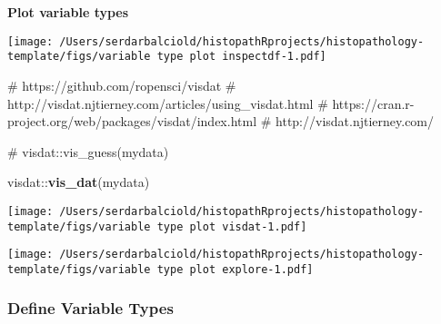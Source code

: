 \documentclass[
]{article}
\newenvironment{Shaded}{\begin{snugshade}}{\end{snugshade}}
\newcommand{\CommentTok}[1]{\textcolor[rgb]{0.54,0.53,0.53}{#1}}
\newcommand{\KeywordTok}[1]{\textcolor[rgb]{0.12,0.11,0.11}{\textbf{#1}}}
\newcommand{\NormalTok}[1]{\textcolor[rgb]{0.12,0.11,0.11}{#1}}
\newcommand{\OperatorTok}[1]{\textcolor[rgb]{0.12,0.11,0.11}{#1}}
\newcommand{\StringTok}[1]{\textcolor[rgb]{0.75,0.01,0.01}{#1}}
\begin{document}
\textbf{Plot variable types}

\begin{Shaded}
\end{Shaded}

\texttt{[image: /Users/serdarbalciold/histopathRprojects/histopathology-template/figs/variable type plot inspectdf-1.pdf]}

\begin{Shaded}
\begin{Highlighting}[]
\CommentTok{# https://github.com/ropensci/visdat}
\CommentTok{# http://visdat.njtierney.com/articles/using_visdat.html}
\CommentTok{# https://cran.r-project.org/web/packages/visdat/index.html}
\CommentTok{# http://visdat.njtierney.com/}

\CommentTok{# visdat::vis_guess(mydata)}

\NormalTok{visdat}\OperatorTok{::}\KeywordTok{vis_dat}\NormalTok{(mydata)}
\end{Highlighting}
\end{Shaded}

\texttt{[image: /Users/serdarbalciold/histopathRprojects/histopathology-template/figs/variable type plot visdat-1.pdf]}

\begin{Shaded}
\end{Shaded}

\texttt{[image: /Users/serdarbalciold/histopathRprojects/histopathology-template/figs/variable type plot explore-1.pdf]}

\hypertarget{define-variable-types-1}{%
\subsubsection{Define Variable Types}\label{define-variable-types-1}}
\end{document}
